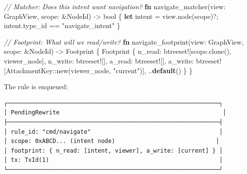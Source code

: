 \documentclass[
]{book}
\newenvironment{Shaded}{}{}
\newcommand{\CommentTok}[1]{\textcolor[rgb]{0.38,0.63,0.69}{\textit{#1}}}
\newcommand{\DataTypeTok}[1]{\textcolor[rgb]{0.56,0.13,0.00}{#1}}
\newcommand{\KeywordTok}[1]{\textcolor[rgb]{0.00,0.44,0.13}{\textbf{#1}}}
\newcommand{\NormalTok}[1]{#1}
\newcommand{\OperatorTok}[1]{\textcolor[rgb]{0.40,0.40,0.40}{#1}}
\newcommand{\PreprocessorTok}[1]{\textcolor[rgb]{0.74,0.48,0.00}{#1}}
\newcommand{\StringTok}[1]{\textcolor[rgb]{0.25,0.44,0.63}{#1}}
\begin{document}
\begin{Shaded}
\begin{Highlighting}[]
\CommentTok{// Matcher: Does this intent want navigation?}
\KeywordTok{fn}\NormalTok{ navigate\_matcher(view}\OperatorTok{:}\NormalTok{ GraphView}\OperatorTok{,}\NormalTok{ scope}\OperatorTok{:} \OperatorTok{\&}\NormalTok{NodeId) }\OperatorTok{{-}\textgreater{}} \DataTypeTok{bool} \OperatorTok{\{}
    \KeywordTok{let}\NormalTok{ intent }\OperatorTok{=}\NormalTok{ view}\OperatorTok{.}\NormalTok{node(scope)}\OperatorTok{?;}
\NormalTok{    intent}\OperatorTok{.}\NormalTok{type\_id }\OperatorTok{==} \StringTok{"navigate\_intent"}
\OperatorTok{\}}

\CommentTok{// Footprint: What will we read/write?}
\KeywordTok{fn}\NormalTok{ navigate\_footprint(view}\OperatorTok{:}\NormalTok{ GraphView}\OperatorTok{,}\NormalTok{ scope}\OperatorTok{:} \OperatorTok{\&}\NormalTok{NodeId) }\OperatorTok{{-}\textgreater{}}\NormalTok{ Footprint }\OperatorTok{\{}
\NormalTok{    Footprint }\OperatorTok{\{}
\NormalTok{        n\_read}\OperatorTok{:} \PreprocessorTok{btreeset!}\NormalTok{[scope}\OperatorTok{.}\NormalTok{clone()}\OperatorTok{,}\NormalTok{ viewer\_node]}\OperatorTok{,}
\NormalTok{        n\_write}\OperatorTok{:} \PreprocessorTok{btreeset!}\NormalTok{[]}\OperatorTok{,}
\NormalTok{        a\_read}\OperatorTok{:} \PreprocessorTok{btreeset!}\NormalTok{[]}\OperatorTok{,}
\NormalTok{        a\_write}\OperatorTok{:} \PreprocessorTok{btreeset!}\NormalTok{[}\PreprocessorTok{AttachmentKey::}\NormalTok{new(viewer\_node}\OperatorTok{,} \StringTok{"current"}\NormalTok{)]}\OperatorTok{,}
        \OperatorTok{..}\KeywordTok{default}\NormalTok{()}
    \OperatorTok{\}}
\OperatorTok{\}}
\end{Highlighting}
\end{Shaded}

The rule is enqueued:

\begin{verbatim}
┌─────────────────────────────────────────────────────────────┐
│ PendingRewrite                                               │
├─────────────────────────────────────────────────────────────┤
│ rule_id: "cmd/navigate"                                     │
│ scope: 0xABCD... (intent node)                             │
│ footprint: { n_read: [intent, viewer], a_write: [current] } │
│ tx: TxId(1)                                                 │
└─────────────────────────────────────────────────────────────┘
\end{verbatim}
\end{document}

